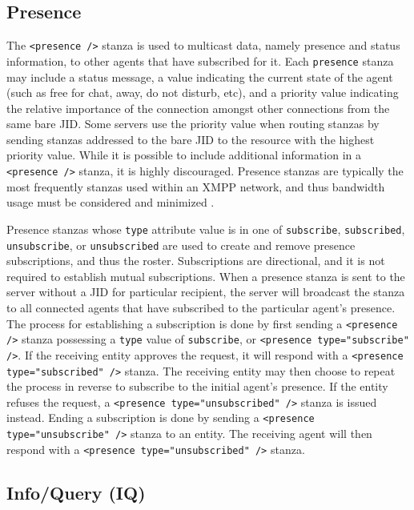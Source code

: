 \subsection{Presence}
\label{sec:Presence}

The \texttt{<presence />} stanza is used to multicast data, namely presence
and status information, to other agents that have subscribed for it. Each
\texttt{presence} stanza may include a status message, a value indicating the
current state of the agent (such as free for chat, away, do not disturb, etc),
and a priority value indicating the relative importance of the connection
amongst other connections from the same bare JID. Some servers use the priority
value when routing stanzas by sending stanzas addressed to the bare JID
to the resource with the highest priority value. While it is possible to
include additional information in a \texttt{<presence />} stanza, it is highly
discouraged. Presence stanzas are typically the most frequently stanzas used
within an XMPP network, and thus bandwidth usage must be considered and
minimized \cite{RFC3921}.

Presence stanzas whose \texttt{type} attribute value is in one of
\texttt{subscribe}, \texttt{subscribed}, \texttt{unsubscribe}, or
\texttt{unsubscribed} are used to create and remove presence subscriptions,
and thus the roster. Subscriptions are directional, and it is not required
to establish mutual subscriptions. When a presence stanza is sent to the
server without a JID for particular recipient, the server will broadcast
the stanza to all connected agents that have subscribed to the particular
agent's presence. The process for establishing a subscription is done by
first sending a \texttt{<presence />} stanza possessing a \texttt{type} value
of \texttt{subscribe}, or \texttt{<presence type="subscribe" />}. If the
receiving entity approves the request, it will respond with a \texttt{<presence
type="subscribed" />} stanza. The receiving entity may then choose to repeat
the process in reverse to subscribe to the initial agent's presence. If the
entity refuses the request, a \texttt{<presence type="unsubscribed" />} stanza
is issued instead. Ending a subscription is done by sending a \texttt{<presence
type="unsubscribe" />} stanza to an entity. The receiving agent will then
respond with a \texttt{<presence type="unsubscribed" />} stanza.


\subsection{Info/Query (IQ)}
\label{sec:Iq}

